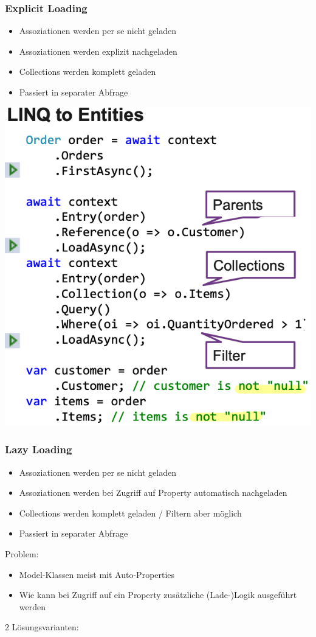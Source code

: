 \subsubsection{Explicit Loading}
\begin{itemize}
    \item Assoziationen werden per se nicht geladen
    \item Assoziationen werden explizit nachgeladen
    \item Collections werden komplett geladen
    \item Passiert in separater Abfrage
\end{itemize}
\vspace{-8pt}
\begin{center}
    \includegraphics[scale=.4]{graphic/efc/explicit loading.png}
\end{center}
\vspace{-8pt}

\subsubsection{Lazy Loading}
\begin{itemize}
    \item Assoziationen werden per se nicht geladen
    \item Assoziationen werden bei Zugriff auf Property automatisch nachgeladen
    \item Collections werden komplett geladen / Filtern aber möglich
    \item Passiert in separater Abfrage
\end{itemize}
Problem:
\begin{itemize}
    \item Model-Klassen meist mit Auto-Properties
    \item Wie kann bei Zugriff auf ein Property zusätzliche (Lade-)Logik ausgeführt werden
\end{itemize}
2 Lösungsvarianten:

